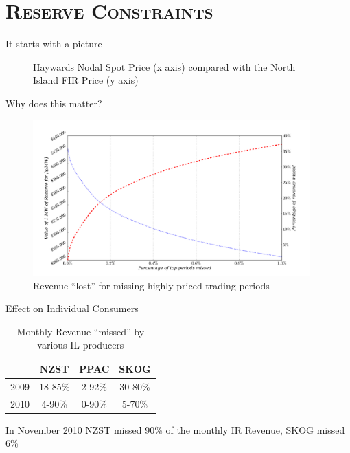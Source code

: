 \documentclass[xcolor=x11names,compress]{beamer}
\renewcommand{\(}{\begin{columns}}
\renewcommand{\)}{\end{columns}}
\newcommand{\<}[1]{\begin{column}{#1}}
\renewcommand{\>}{\end{column}}
\begin{document}
\section{\scshape Reserve Constraints}
\begin{frame}{It starts with a picture}
\begin{figure}
\caption{Haywards Nodal Spot Price (x axis) compared with the North Island
FIR Price (y axis)}
\end{figure}
\end{frame}

\begin{frame}{Why does this matter?}
\begin{figure}
\includegraphics[width=0.95\textwidth]{img/reserveprice.png}
\caption{Revenue ``lost'' for missing highly priced trading periods}
\end{figure}
\end{frame}

\begin{frame}{Effect on Individual Consumers}
\begin{table}
\caption{Monthly Revenue ``missed'' by various IL producers}
\begin{tabular}{cccc}
\toprule
& NZST & PPAC & SKOG \\
\midrule
2009 & 18-85\% & 2-92\% & 30-80\% \\
2010 & 4-90\% & 0-90\% & 5-70\% \\
\bottomrule
\end{tabular}
\end{table}
In November 2010 NZST missed 90\% of the monthly IR Revenue, SKOG missed 6\%
\vspace{2cm}
\end{frame}
\end{document}
